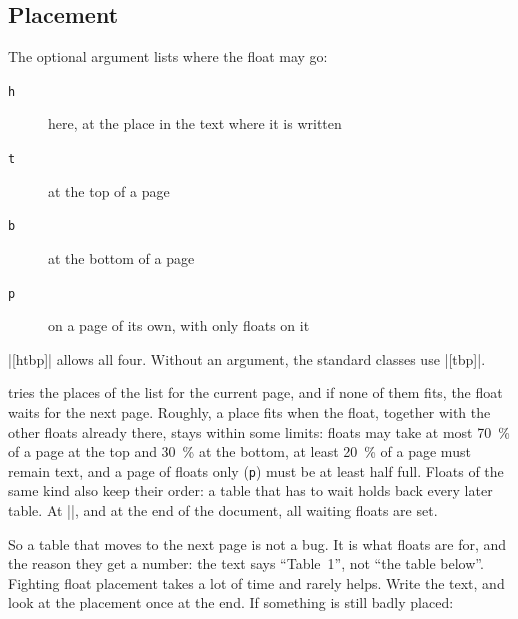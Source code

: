 \subsection{Placement}

The optional argument lists where the float may go:

\begin{description}
    \item[\texttt{h}] here, at the place in the text where it is written
    \item[\texttt{t}] at the top of a page
    \item[\texttt{b}] at the bottom of a page
    \item[\texttt{p}] on a page of its own, with only floats on it
\end{description}

\code|[htbp]| allows all four.
Without an argument, the standard classes use \code|[tbp]|.

 tries the places of the list for the current page,
and if none of them fits, the float waits for the next page.
Roughly, a place fits when the float, together with the other floats already there, stays within some limits:
floats may take at most \qty{70}{\percent} of a page at the top and \qty{30}{\percent} at the bottom,
at least \qty{20}{\percent} of a page must remain text,
and a page of floats only (\texttt{p}) must be at least half full.
Floats of the same kind also keep their order:
a table that has to wait holds back every later table.
At \code|\clearpage|, and at the end of the document, all waiting floats are set.

So a table that moves to the next page is not a bug.
It is what floats are for,
and the reason they get a number: the text says \enquote{Table~1}, not \enquote{the table below}.
Fighting float placement takes a lot of time and rarely helps.
Write the text, and look at the placement once at the end.
If something is still badly placed:

